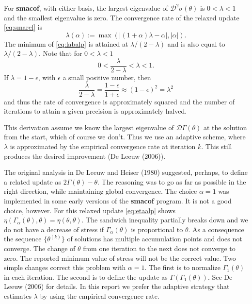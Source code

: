 \documentclass[
  12pt,
]{article}
\begin{document}
For \textbf{smacof}, with either basis, the largest eigenvalue of \(\mathcal{D}^2\sigma(\theta)\) is \(0<\lambda<1\) and the smallest eigenvalue is zero. The convergence rate of the relaxed update \eqref{eq:smarel} is
\begin{equation}
\lambda(\alpha):=\max(|(1+\alpha)\lambda-\alpha|,|\alpha|).
\label{eq:labalp}
\end{equation}
The minimum of \eqref{eq:labalp} is attained at \(\lambda/(2-\lambda)\) and is also equal to
\(\lambda/(2-\lambda)\). Note that for \(0<\lambda<1\)
\begin{equation}
0<\frac{\lambda}{2-\lambda}<\lambda<1.
\label{eq:labbnds}
\end{equation}
If \(\lambda=1-\epsilon\), with \(\epsilon\) a small positive number, then
\begin{equation}
\frac{\lambda}{2-\lambda}=\frac{1-\epsilon}{1+\epsilon}\approx(1-\epsilon)^2=\lambda^2
\label{eq:labeps}
\end{equation}
and thus the rate of convergence is approximately squared and the number of iterations to attain
a given precision is approximately halved.

This derivation assume we know the largest eigenvalue of \(\mathcal{D}\Gamma(\theta)\) at the solution from the start, which of course we don't. Thus we use an adaptive scheme, where \(\lambda\) is
approximated by the empirical convergence rate at iteration \(k\). This still produces the
desired improvement (De Leeuw (2006)).

The original analysis in De Leeuw and Heiser (1980) suggested, perhaps, to define
a related update as \(2\Gamma(\theta)-\theta\). The reasoning was to go as far as possible
in the right direction, while maintaining global convergence. The choice \(\alpha=1\) was implemented in some early versions of the \textbf{smacof} program. It is not a good choice,
however. For this relaxed update \eqref{eq:etaalp} shows
\(\eta(\Gamma_\alpha(\theta),\theta)=\eta(\theta,\theta)\). The sandwich
inequality partially breaks down and we do not have a decrease of stress if
\(\Gamma_\alpha(\theta)\) is proportional to \(\theta\). As a consequence the
sequence \(\{\theta^{(k)}\}\) of solutions has multiple accumulation points
and does not converge. The change of \(\theta\) from one iteration to the next does not
converge to zero. The reported minimum value of stress will not be the correct
value. Two simple changes correct this problem with \(\alpha=1\). The first
is to normalize \(\Gamma_1(\theta)\) in each iteration. The second is
to define the update as \(\Gamma(\Gamma_1(\theta))\). See De Leeuw (2006)
for details. In this report we prefer the adaptive strategy that
estimates \(\lambda\) by using the empirical convergence rate.
\end{document}

